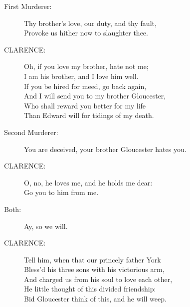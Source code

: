 \documentclass{article}
\begin{document}
\begin{description}
\item[First Murderer:] 
\hspace{1pt}Thy brother's love, our duty, and thy fault,\\
\hspace{1pt}Provoke us hither now to slaughter thee.\\
\end{description}
\begin{description}
\item[CLARENCE:] 
\hspace{1pt}Oh, if you love my brother, hate not me;\\
\hspace{1pt}I am his brother, and I love him well.\\
\hspace{1pt}If you be hired for meed, go back again,\\
\hspace{1pt}And I will send you to my brother Gloucester,\\
\hspace{1pt}Who shall reward you better for my life\\
\hspace{1pt}Than Edward will for tidings of my death.\\
\end{description}
\begin{description}
\item[Second Murderer:] 
\hspace{1pt}You are deceived, your brother Gloucester hates you.\\
\end{description}
\begin{description}
\item[CLARENCE:] 
\hspace{1pt}O, no, he loves me, and he holds me dear:\\
\hspace{1pt}Go you to him from me.\\
\end{description}
\begin{description}
\item[Both:] 
\hspace{1pt}Ay, so we will.\\
\end{description}
\begin{description}
\item[CLARENCE:] 
\hspace{1pt}Tell him, when that our princely father York\\
\hspace{1pt}Bless'd his three sons with his victorious arm,\\
\hspace{1pt}And charged us from his soul to love each other,\\
\hspace{1pt}He little thought of this divided friendship:\\
\hspace{1pt}Bid Gloucester think of this, and he will weep.\\
\end{description}
\end{document}
